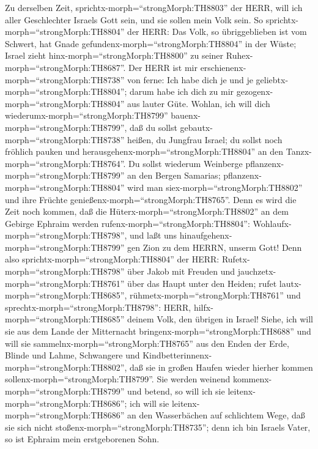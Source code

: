  Zu derselben Zeit, sprichtx-morph=``strongMorph:TH8803''
der HERR, will ich aller Geschlechter Israels Gott sein, und sie sollen
mein Volk sein.  So sprichtx-morph=``strongMorph:TH8804''
der HERR: Das Volk, so übriggeblieben ist vom Schwert, hat Gnade
gefundenx-morph=``strongMorph:TH8804'' in der Wüste; Israel zieht
hinx-morph=``strongMorph:TH8800'' zu seiner
Ruhex-morph=``strongMorph:TH8687''.  Der HERR ist mir
erschienenx-morph=``strongMorph:TH8738'' von ferne: Ich habe dich je und
je geliebtx-morph=``strongMorph:TH8804''; darum habe ich dich zu mir
gezogenx-morph=``strongMorph:TH8804'' aus lauter Güte. 
Wohlan, ich will dich wiederumx-morph=``strongMorph:TH8799''
bauenx-morph=``strongMorph:TH8799'', daß du sollst
gebautx-morph=``strongMorph:TH8738'' heißen, du Jungfrau Israel; du
sollst noch fröhlich pauken und
herausgehenx-morph=``strongMorph:TH8804'' an den
Tanzx-morph=``strongMorph:TH8764''.  Du sollst wiederum
Weinberge pflanzenx-morph=``strongMorph:TH8799'' an den Bergen Samarias;
pflanzenx-morph=``strongMorph:TH8804'' wird man
siex-morph=``strongMorph:TH8802'' und ihre Früchte
genießenx-morph=``strongMorph:TH8765''.  Denn es wird die
Zeit noch kommen, daß die Hüterx-morph=``strongMorph:TH8802'' an dem
Gebirge Ephraim werden rufenx-morph=``strongMorph:TH8804'':
Wohlaufx-morph=``strongMorph:TH8798'', und laßt uns
hinaufgehenx-morph=``strongMorph:TH8799'' gen Zion zu dem HERRN, unserm
Gott!  Denn also sprichtx-morph=``strongMorph:TH8804'' der
HERR: Rufetx-morph=``strongMorph:TH8798'' über Jakob mit Freuden und
jauchzetx-morph=``strongMorph:TH8761'' über das Haupt unter den Heiden;
rufet lautx-morph=``strongMorph:TH8685'',
rühmetx-morph=``strongMorph:TH8761'' und
sprechtx-morph=``strongMorph:TH8798'': HERR,
hilfx-morph=``strongMorph:TH8685'' deinem Volk, den übrigen in Israel!
 Siehe, ich will sie aus dem Lande der Mitternacht
bringenx-morph=``strongMorph:TH8688'' und will sie
sammelnx-morph=``strongMorph:TH8765'' aus den Enden der Erde, Blinde und
Lahme, Schwangere und Kindbetterinnenx-morph=``strongMorph:TH8802'', daß
sie in großen Haufen wieder hierher kommen
sollenx-morph=``strongMorph:TH8799''.  Sie werden weinend
kommenx-morph=``strongMorph:TH8799'' und betend, so will ich sie
leitenx-morph=``strongMorph:TH8686''; ich will sie
leitenx-morph=``strongMorph:TH8686'' an den Wasserbächen auf schlichtem
Wege, daß sie sich nicht stoßenx-morph=``strongMorph:TH8735''; denn ich
bin Israels Vater, so ist Ephraim mein erstgeborenen Sohn. 
